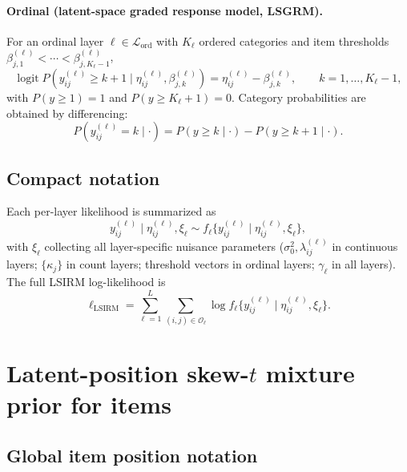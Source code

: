\documentclass[11pt]{article}
\DeclareMathOperator{\logit}{logit}
\begin{document}
\paragraph{Ordinal (latent-space graded response model, LSGRM).}
For an ordinal layer $\ell\in\mathcal L_{\mathrm{ord}}$ with $K_\ell$
ordered categories and item thresholds
$\beta_{j,1}^{(\ell)}<\cdots<\beta_{j,K_\ell-1}^{(\ell)}$,
\begin{equation}
    \logit
    P(y_{ij}^{(\ell)}\geq k+1\mid\eta_{ij}^{(\ell)},\beta_{j,k}^{(\ell)})
    =\eta_{ij}^{(\ell)}-\beta_{j,k}^{(\ell)},
    \qquad k=1,\dots,K_\ell-1,
    \label{eq:lik-ord-cum}
\end{equation}
with $P(y\geq 1)=1$ and $P(y\geq K_\ell+1)=0$.  Category probabilities are
obtained by differencing:
\begin{equation}
    P(y_{ij}^{(\ell)}=k\mid\cdot)=P(y\geq k\mid\cdot)-P(y\geq k+1\mid\cdot).
    \label{eq:lik-ord}
\end{equation}

\subsection{Compact notation}

Each per-layer likelihood is summarized as
\begin{equation}
    y_{ij}^{(\ell)}\mid\eta_{ij}^{(\ell)},\xi_\ell
    \sim f_\ell\{y_{ij}^{(\ell)}\mid\eta_{ij}^{(\ell)},\xi_\ell\},
    \label{eq:lik-generic}
\end{equation}
with $\xi_\ell$ collecting all layer-specific nuisance parameters
($\sigma_0^2,\lambda_{ij}^{(\ell)}$ in continuous layers; $\{\kappa_j\}$ in
count layers; threshold vectors in ordinal layers; $\gamma_\ell$ in all
layers).  The full LSIRM log-likelihood is
\begin{equation}
    \ell_{\mathrm{LSIRM}}=
    \sum_{\ell=1}^L\sum_{(i,j)\in\mathcal O_\ell}
    \log f_\ell\{y_{ij}^{(\ell)}\mid\eta_{ij}^{(\ell)},\xi_\ell\}.
    \label{eq:lsirm-loglik}
\end{equation}

\section{Latent-position skew-$t$ mixture prior for items}
\label{sec:skewt-mixture}

\subsection{Global item position notation}
\end{document}
